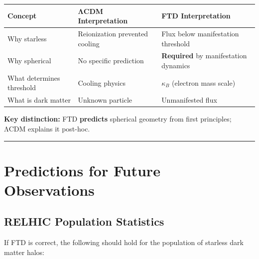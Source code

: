 \documentclass[
  11pt,
  letterpaper,
  twoside,
  openright]{book}
\begin{document}
\begin{longtable}[]{@{}
  >{\raggedright\arraybackslash}p{}
  >{\raggedright\arraybackslash}p{}
  >{\raggedright\arraybackslash}p{}@{}}
\toprule\noalign{}
\begin{minipage}[b]{\linewidth}\raggedright
Concept
\end{minipage} & \begin{minipage}[b]{\linewidth}\raggedright
ΛCDM Interpretation
\end{minipage} & \begin{minipage}[b]{\linewidth}\raggedright
FTD Interpretation
\end{minipage} \\
\midrule\noalign{}
\endhead
\bottomrule\noalign{}
\endlastfoot
Why starless & Reionization prevented cooling & Flux below manifestation
threshold \\
Why spherical & No specific prediction & \textbf{Required} by
manifestation dynamics \\
What determines threshold & Cooling physics & \(\kappa_B\) (electron
mass scale) \\
What is dark matter & Unknown particle & Unmanifested flux \\
\end{longtable}

\textbf{Key distinction:} FTD \textbf{predicts} spherical geometry from
first principles; ΛCDM explains it post-hoc.

\begin{center}\rule{0.5\linewidth}{0.5pt}\end{center}

\section{Predictions for Future Observations}\label{sec-future-obs}

\subsection{RELHIC Population
Statistics}\label{relhic-population-statistics}

If FTD is correct, the following should hold for the population of
starless dark matter halos:
\end{document}
